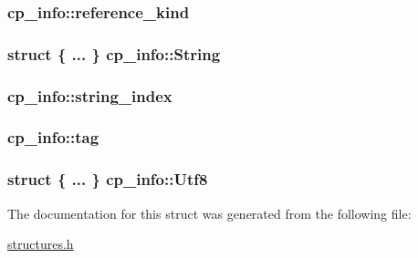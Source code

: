 \subsubsection[{\texorpdfstring{reference\+\_\+kind}{reference_kind}}]{ cp\+\_\+info\+::reference\+\_\+kind}\hypertarget{structcp__info_a13e5aa07b7aa482061b89f4d7379a2dd}{}\label{structcp__info_a13e5aa07b7aa482061b89f4d7379a2dd}
\subsubsection[{\texorpdfstring{String}{String}}]{\setlength{\rightskip}{0pt plus 5cm}struct \{ ... \}   cp\+\_\+info\+::\+String}\hypertarget{structcp__info_a453cf965166c542ff75a14db651769e3}{}\label{structcp__info_a453cf965166c542ff75a14db651769e3}
\subsubsection[{\texorpdfstring{string\+\_\+index}{string_index}}]{ cp\+\_\+info\+::string\+\_\+index}\hypertarget{structcp__info_ae760e12a2ee01b0ace3d35170ca07981}{}\label{structcp__info_ae760e12a2ee01b0ace3d35170ca07981}
\subsubsection[{\texorpdfstring{tag}{tag}}]{ cp\+\_\+info\+::tag}\hypertarget{structcp__info_a045b8801a6e96a2a31d3b62ea684f141}{}\label{structcp__info_a045b8801a6e96a2a31d3b62ea684f141}
\subsubsection[{\texorpdfstring{Utf8}{Utf8}}]{\setlength{\rightskip}{0pt plus 5cm}struct \{ ... \}   cp\+\_\+info\+::\+Utf8}\hypertarget{structcp__info_af0b0a05e0079e3d1b0c99cd3c0e4463a}{}\label{structcp__info_af0b0a05e0079e3d1b0c99cd3c0e4463a}


The documentation for this struct was generated from the following file\+:\begin{DoxyCompactItemize}
\item 
\hyperlink{structures_8h}{structures.\+h}\end{DoxyCompactItemize}
